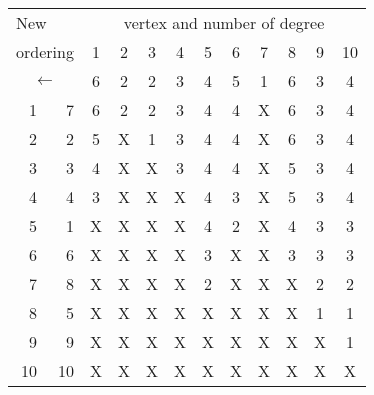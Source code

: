 \documentclass{standalone}
\begin{document}
	\begin{tabular}{rr|cccccccccc}
		\multicolumn{2}{l|}{New} & \multicolumn{10}{c}{vertex and number of degree}\\
		\multicolumn{2}{l|}{ordering} & 1 & 2 & 3 & 4 & 5 & 6 & 7 & 8 & 9 & 10\\
		\multicolumn{2}{c|}{$\leftarrow$} & 6 & 2 & 2 & 3 & 4 & 5 & 1 & 6 & 3 & 4\\
		\hline
		1 & 7 & 6 & 2 & 2 & 3 & 4 & 4 & X & 6 & 3 & 4\\
		2 & 2 & 5 & X & 1 & 3 & 4 & 4 & X & 6 & 3 & 4\\
		3 & 3 & 4 & X & X & 3 & 4 & 4 & X & 5 & 3 & 4\\
		4 & 4 & 3 & X & X & X & 4 & 3 & X & 5 & 3 & 4\\
		5 & 1 & X & X & X & X & 4 & 2 & X & 4 & 3 & 3\\
		6 & 6 & X & X & X & X & 3 & X & X & 3 & 3 & 3\\
		7 & 8 & X & X & X & X & 2 & X & X & X & 2 & 2\\
		8 & 5 & X & X & X & X & X & X & X & X & 1 & 1\\
		9 & 9 & X & X & X & X & X & X & X & X & X & 1\\
		10&10 & X & X & X & X & X & X & X & X & X & X\\
	\end{tabular}
\end{document}
